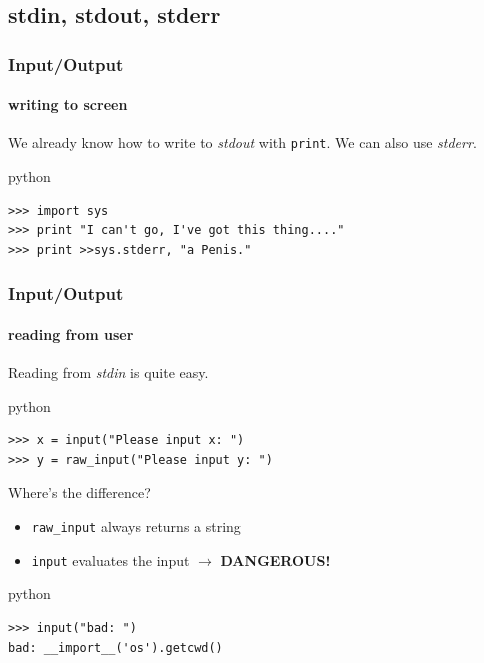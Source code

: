 \documentclass{beamer}
\begin{document}
\subsection{stdin, stdout, stderr}
    
\begin{frame}[fragile]
	\frametitle{Input/Output}
	\framesubtitle{writing to screen}
	
	We already know how to write to \emph{stdout} with \texttt{print}. We can also use \emph{stderr}.
	\begin{exampleblock}{python}
	\begin{lstlisting}
>>> import sys
>>> print "I can't go, I've got this thing...."
>>> print >>sys.stderr, "a Penis."
	\end{lstlisting}
	\end{exampleblock}
\end{frame}

\begin{frame}[fragile]
	\frametitle{Input/Output}
	\framesubtitle{reading from user}
	
	Reading from \emph{stdin} is quite easy.
	\begin{exampleblock}{python}
	\begin{lstlisting}
>>> x = input("Please input x: ")
>>> y = raw_input("Please input y: ")
	\end{lstlisting}
	\end{exampleblock}
	
\pause

	\begin{block}{Where's the difference?}
	\begin{itemize}
	\item \texttt{raw\_input} always returns a string 
\pause
	\item \texttt{input} evaluates the input \pause $ \rightarrow $ \textbf{DANGEROUS!}
	\end{itemize}
	\end{block}

\pause

	\begin{alertblock}{python}
	\begin{lstlisting}
>>> input("bad: ")
bad: __import__('os').getcwd()
	\end{lstlisting}
	\end{alertblock}

\end{frame}

\end{document}
